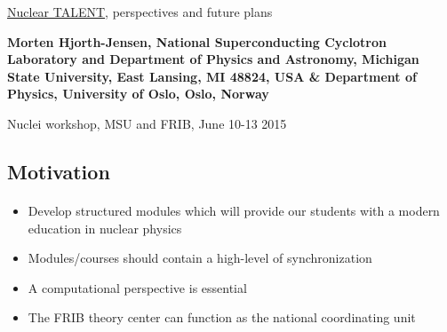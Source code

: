 \documentclass[%
twoside,                 %
final,                   %
10pt]{article}
\begin{document}






\thispagestyle{empty}

\begin{center}
{\LARGE\bf
\begin{spacing}{1.25}
\href{{http://www.nucleartalent.org}}{Nuclear TALENT}, perspectives and future plans
\end{spacing}
}
\end{center}


\begin{center}
{\bf Morten Hjorth-Jensen, National Superconducting Cyclotron Laboratory and Department of Physics and Astronomy, Michigan State University, East Lansing, MI 48824, USA {\&} Department of Physics, University of Oslo, Oslo, Norway${}^{}$} \\ [0mm]
\end{center}

    \begin{center}
\end{center}
    

\begin{center} %
Nuclei workshop, MSU and FRIB, June 10-13 2015
\end{center}

\vspace{1cm}


\subsection*{Motivation}

\paragraph{}
\begin{itemize}
\item Develop structured modules which will provide our students with a modern education in nuclear physics

\item Modules/courses should contain a high-level of synchronization

\item A computational perspective is essential

\item The FRIB theory center can function as the national coordinating unit
\end{itemize}
\end{document}
